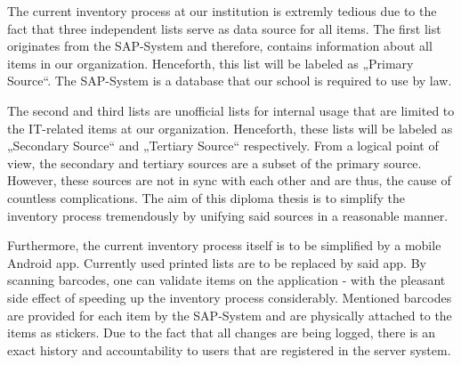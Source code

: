 The current inventory process at our institution is extremly tedious due to the fact that three independent lists serve as 
data source for all items. The first list originates from the SAP-System and therefore, contains information about all items in our organization.
Henceforth, this list will be labeled as „Primary Source“. The SAP-System is a database that our school is required to use by law. 

The second and third lists are unofficial lists for internal usage that are limited to the IT-related items at our organization. 
Henceforth, these lists will be labeled as „Secondary Source“ and „Tertiary Source“ respectively.  From a logical point of view, 
the secondary and tertiary sources are a subset of the primary source. However, these sources are not in sync with each other and are thus, the cause 
of countless complications. The aim of this diploma thesis is to simplify the inventory process tremendously by unifying said sources in a reasonable manner.

Furthermore, the current inventory process itself is to be simplified by a mobile Android app. Currently used printed lists are to be replaced 
by said app. By scanning barcodes, one can validate items on the application - with the pleasant side effect of speeding up the inventory process
considerably. Mentioned barcodes are provided for each item by the SAP-System and are physically attached to the items as stickers. 
Due to the fact that all changes are being logged, there is an exact history and accountability to users that are registered in the server system.